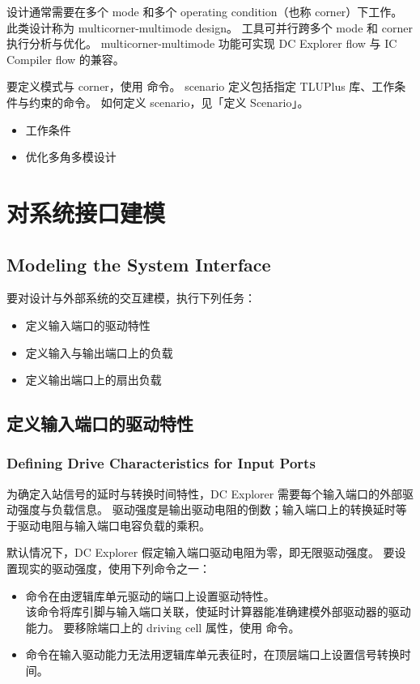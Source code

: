 设计通常需要在多个 mode 和多个 operating condition（也称 corner）下工作。
此类设计称为 multicorner-multimode design。
工具可并行跨多个 mode 和 corner 执行分析与优化。
multicorner-multimode 功能可实现 DC Explorer flow 与 IC Compiler flow 的兼容。

要定义模式与 corner，使用  命令。
scenario 定义包括指定 TLUPlus 库、工作条件与约束的命令。
如何定义 scenario，见「定义 Scenario」。

\begin{seeAlsoBox}
\begin{itemize}
  \item 工作条件
  \item 优化多角多模设计
\end{itemize}
\end{seeAlsoBox}

\section{对系统接口建模}
\subsection*{Modeling the System Interface}

要对设计与外部系统的交互建模，执行下列任务：
\begin{itemize}
  \item 定义输入端口的驱动特性
  \item 定义输入与输出端口上的负载
  \item 定义输出端口上的扇出负载
\end{itemize}

\subsection{定义输入端口的驱动特性}
\subsubsection*{Defining Drive Characteristics for Input Ports}

为确定入站信号的延时与转换时间特性，DC Explorer 需要每个输入端口的外部驱动强度与负载信息。
驱动强度是输出驱动电阻的倒数；输入端口上的转换延时等于驱动电阻与输入端口电容负载的乘积。

默认情况下，DC Explorer 假定输入端口驱动电阻为零，即无限驱动强度。
要设置现实的驱动强度，使用下列命令之一：
\begin{itemize}
  \item {} 命令在由逻辑库单元驱动的端口上设置驱动特性。\\
        该命令将库引脚与输入端口关联，使延时计算器能准确建模外部驱动器的驱动能力。
        要移除端口上的 driving cell 属性，使用  命令。
  \item {} 命令在输入驱动能力无法用逻辑库单元表征时，在顶层端口上设置信号转换时间。
\end{itemize}

